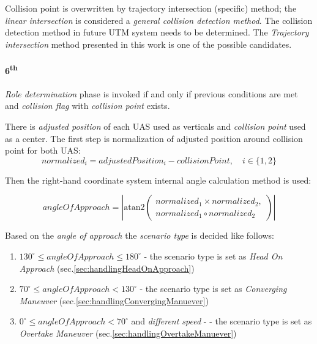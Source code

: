 \begin{note}
    Collision point is overwritten by trajectory intersection (specific) method; the \emph{linear intersection} is considered a \emph{general collision detection method}. The collision detection method in future UTM system needs to be determined. The \emph{Trajectory intersection} method presented in this work is one of the possible candidates. 
\end{note}

\paragraph{6\textsuperscript{th}} \emph{Role determination} phase is invoked if and only if previous conditions are met and \emph{collision flag} with \emph{collision point} exists.

There is \emph{adjusted position} of each UAS used as verticals and \emph{collision point} used as a center. The first step is normalization of adjusted position around collision point for both UAS:
\begin{equation}
    normalized_i =  adjustedPosition_i - collisionPoint,\quad i \in \{1, 2\}
\end{equation}

Then the right-hand coordinate system internal angle calculation method is used:


\begin{equation}
    angleOfApproach = \left|\text{atan2}\left(\begin{gathered}normalized_1 \times normalized_2, \\normalized_1 \circ normalized_2\end{gathered}\right)\right|
\end{equation}

\noindent Based on the \emph{angle of approach} the \emph{scenario type} is  decided like follows:
\begin{enumerate}
    \item $130^\circ \le angle Of Approach  \le 180^\circ$ - the scenario type is set as \emph{Head On Approach} (sec.\ref{sec:handlingHeadOnApproach})
    \item $70^\circ \le angle Of Approach  < 130^\circ$ - the scenario type is set as \emph{Converging Maneuver} (sec.\ref{sec:handlingConvergingManuever})
    \item $0^\circ \le angle Of Approach  < 70^\circ$ and \emph{different speed} -   - the scenario type is set as \emph{Overtake Maneuver} (sec.\ref{sec:handlingOvertakeManuever})
\end{enumerate}

